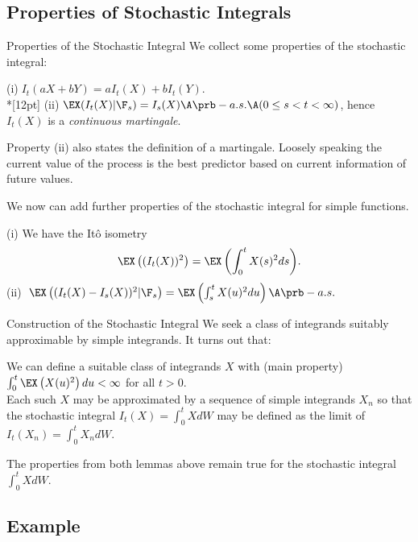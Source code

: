 \subsection{Properties of Stochastic Integrals}

Properties of the Stochastic Integral
	We collect some properties of the stochastic integral:
	\begin{lemma}
	(i)$\; I_t (aX + bY) = a I_t (X) + b I_t (Y)$.\\*[12pt]
	(ii)$\; \EX (I_t
	(X) | {\F}_s) = I_s(X) \A \prb-a.s. \A (0 \leq s < t < \infty)$,
	hence $I_t (X)$ is a {\it continuous martingale}.
	\end{lemma}

	Property (ii) also states the definition of a martingale. Loosely speaking the
	current value of the process is the best predictor based on current information of future values. 


	We now can add further properties of the stochastic integral for
	simple functions.
	
	\begin{lemma}%
	(i) We have the It\^{o} isometry $$ \EX\left((I_t(X))^2\right) =
	\EX\left(\int_0^t X(s)^2 ds\right)\!. $$ (ii)
	$\; \EX\left((I_t(X) -
	I_s(X))^2 | {\F}_s\right) = \EX\left(\int_s^t X(u)^2 du\right) \A
	\prb-a.s.$
	\end{lemma}

 
Construction of the Stochastic Integral
	We seek a class of integrands suitably approximable by simple
	integrands.  It turns out that:

 	We can define a suitable class of
	integrands $X$ with (main property) $\int_0^t
	\EX\left( X(u)^2\right) du < \infty$ for all $t > 0$.\\ 
  
	Each such $X$ may be approximated by a sequence of simple integrands
	$X_n$ so that the stochastic integral $I_t(X) = \int_0^t X dW$ may
	be defined as the limit of $I_t(X_n) = \int_0^t X_n dW$.
 
	The properties from both lemmas above remain true for the
	stochastic integral $\int_0^t X dW$.


\subsection{Example}

